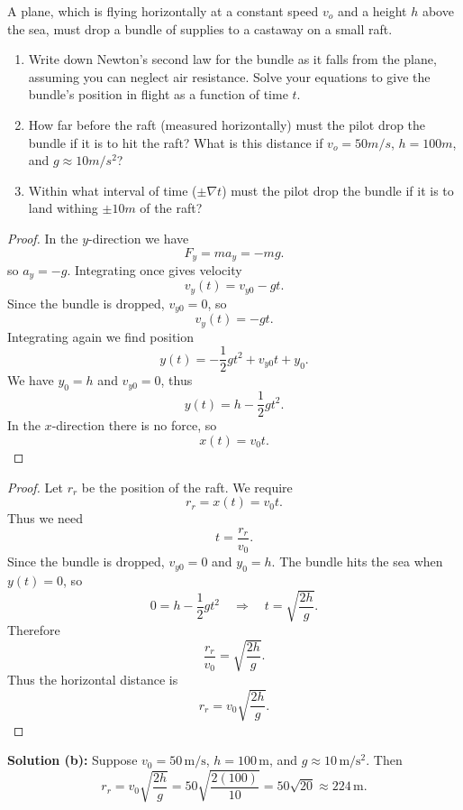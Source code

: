 \begin{tcolorbox}[title=Problem 36, breakable]
    A plane, which is flying horizontally at a constant speed $v_o$
    and a height $h$ above the sea, must drop a bundle of supplies to a 
    castaway on a small raft. 
    \begin{enumerate}
        \item Write down Newton's second law for the bundle as it falls from the plane,
        assuming you can neglect air resistance. Solve your equations  to give the bundle's
        position in flight as a function of time $t$.
        \item How far before the raft (measured horizontally) must the pilot drop 
        the bundle if it is to hit the raft? What is this distance if $v_o = 50 m/s$,
        $h = 100m$, and $g \approx 10 m/s^2$?
        \item Within what interval of time ($\pm \nabla t$) must the pilot drop 
        the bundle if it is to land withing $\pm 10 m$ of the raft?
    \end{enumerate}
\end{tcolorbox}

\begin{proof}
    In the $y$-direction we have 
    \[
    F_y = m a_y = -m g.
    \]
    so $a_y = -g$.
    Integrating once gives velocity
    \[
    v_y(t) = v_{y0} - gt.
    \]
    Since the bundle is dropped, $v_{y0} = 0$, so
    \[
    v_y(t) = -gt.
    \]
    Integrating again we find position
    \[
    y(t) = -\frac{1}{2} g t^2 + v_{y0} t + y_0.
    \]
    We have $y_0 = h$ and $v_{y0} = 0$, thus
    \[
    y(t) = h - \frac{1}{2} g t^2.
    \]
    In the $x$-direction there is no force, so
    \[
    x(t) = v_0 t.
    \]
\end{proof}

\begin{proof}
    Let $r_r$ be the position of the raft.
    We require 
    \[
    r_r = x(t) = v_0 t.
    \]
    Thus we need
    \[
    t = \frac{r_r}{v_0}.
    \]
    Since the bundle is dropped, $v_{y0} = 0$ and $y_0 = h$.
    The bundle hits the sea when $y(t)=0$, so
    \[
    0 = h - \frac{1}{2}gt^2
    \quad \Rightarrow \quad
    t = \sqrt{\frac{2h}{g}}.
    \]
    Therefore
    \[
    \frac{r_r}{v_0} = \sqrt{\frac{2h}{g}}.
    \]
    Thus the horizontal distance is
    \[
    r_r = v_0 \sqrt{\frac{2h}{g}}.
    \]
\end{proof}

\textbf{Solution (b):}
Suppose $v_0 = 50\,\mathrm{m/s}$,
$h = 100\,\mathrm{m}$, and $g \approx 10\,\mathrm{m/s^2}$.
Then
\[
r_r = v_0 \sqrt{\frac{2h}{g}}
= 50 \sqrt{\frac{2(100)}{10}}
= 50 \sqrt{20} \approx 224\,\mathrm{m}.
\]

